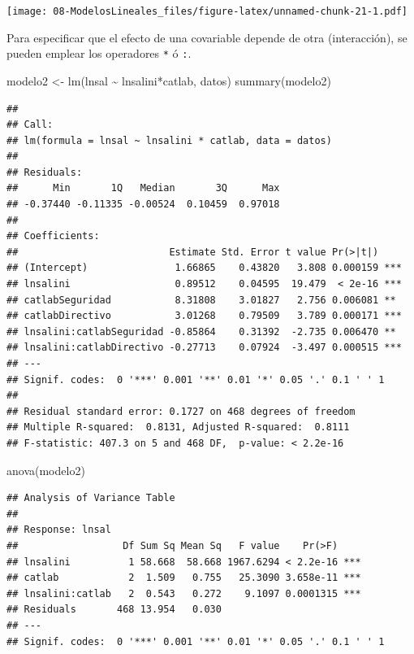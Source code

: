 \documentclass[
]{book}
\newenvironment{Shaded}{\begin{snugshade}}{\end{snugshade}}
\newcommand{\FunctionTok}[1]{\textcolor[rgb]{0.00,0.00,0.00}{#1}}
\newcommand{\NormalTok}[1]{#1}
\newcommand{\OtherTok}[1]{\textcolor[rgb]{0.56,0.35,0.01}{#1}}
\newcommand{\SpecialCharTok}[1]{\textcolor[rgb]{0.00,0.00,0.00}{#1}}
\theoremstyle{break}
\theoremstyle{nonumberplain}
\begin{document}
\texttt{[image: 08-ModelosLineales\_files/figure-latex/unnamed-chunk-21-1.pdf]}

Para especificar que el efecto de una covariable depende de otra (interacción),
se pueden emplear los operadores \texttt{*} ó \texttt{:}.

\begin{Shaded}
\begin{Highlighting}[]
\NormalTok{modelo2 }\OtherTok{\textless{}{-}} \FunctionTok{lm}\NormalTok{(lnsal }\SpecialCharTok{\textasciitilde{}}\NormalTok{ lnsalini}\SpecialCharTok{*}\NormalTok{catlab, datos)}
\FunctionTok{summary}\NormalTok{(modelo2)}
\end{Highlighting}
\end{Shaded}

\begin{verbatim}
## 
## Call:
## lm(formula = lnsal ~ lnsalini * catlab, data = datos)
## 
## Residuals:
##      Min       1Q   Median       3Q      Max 
## -0.37440 -0.11335 -0.00524  0.10459  0.97018 
## 
## Coefficients:
##                          Estimate Std. Error t value Pr(>|t|)    
## (Intercept)               1.66865    0.43820   3.808 0.000159 ***
## lnsalini                  0.89512    0.04595  19.479  < 2e-16 ***
## catlabSeguridad           8.31808    3.01827   2.756 0.006081 ** 
## catlabDirectivo           3.01268    0.79509   3.789 0.000171 ***
## lnsalini:catlabSeguridad -0.85864    0.31392  -2.735 0.006470 ** 
## lnsalini:catlabDirectivo -0.27713    0.07924  -3.497 0.000515 ***
## ---
## Signif. codes:  0 '***' 0.001 '**' 0.01 '*' 0.05 '.' 0.1 ' ' 1
## 
## Residual standard error: 0.1727 on 468 degrees of freedom
## Multiple R-squared:  0.8131, Adjusted R-squared:  0.8111 
## F-statistic: 407.3 on 5 and 468 DF,  p-value: < 2.2e-16
\end{verbatim}

\begin{Shaded}
\begin{Highlighting}[]
\FunctionTok{anova}\NormalTok{(modelo2)}
\end{Highlighting}
\end{Shaded}

\begin{verbatim}
## Analysis of Variance Table
## 
## Response: lnsal
##                  Df Sum Sq Mean Sq   F value    Pr(>F)    
## lnsalini          1 58.668  58.668 1967.6294 < 2.2e-16 ***
## catlab            2  1.509   0.755   25.3090 3.658e-11 ***
## lnsalini:catlab   2  0.543   0.272    9.1097 0.0001315 ***
## Residuals       468 13.954   0.030                        
## ---
## Signif. codes:  0 '***' 0.001 '**' 0.01 '*' 0.05 '.' 0.1 ' ' 1
\end{verbatim}
\end{document}
